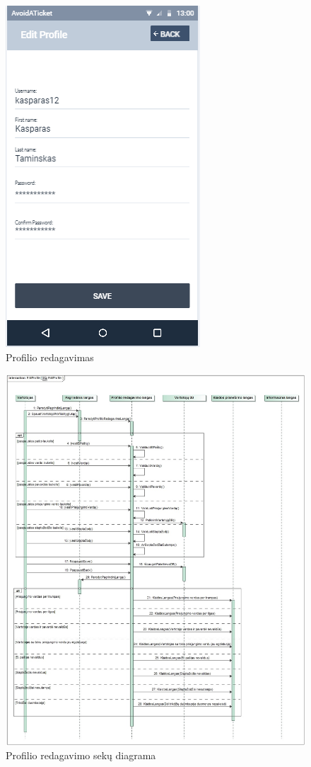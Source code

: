 \documentclass{VUMIFPSkursinis}
\begin{document}
	\begin{figure}[H]
				\centering
				\includegraphics[scale=0.55]{img/mockup_profileedit}
				\caption{Profilio redagavimas}
				\label{img:profilio redagavimas}
			\end{figure}
		\begin{figure}[H]
				\centering
				\includegraphics[scale=0.4]{img/EditProfileSequence}
				\caption{Profilio redagavimo sekų diagrama}
				\label{img:profilio redagavimas RD}
			\end{figure}
\end{document}
